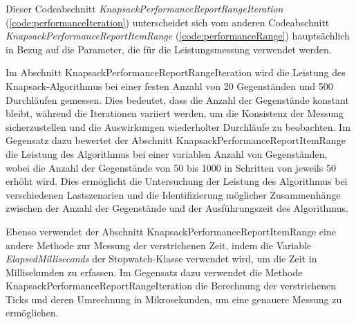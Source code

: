 Dieser Codeabschnitt \textit{KnapsackPerformanceReportRangeIteration} (\ref{code:performanceIteration}) unterscheidet sich vom anderen Codeabschnitt \textit{KnapsackPerformanceReportItemRange} (\ref{code:performanceRange}) hauptsächlich in Bezug auf die Parameter, die für die Leistungsmessung verwendet werden.

Im Abschnitt KnapsackPerformanceReportRangeIteration wird die Leistung des Knapsack-Algorithmus bei einer festen Anzahl von 20 Gegenständen und 500 Durchläufen gemessen. Dies bedeutet, dass die Anzahl der Gegenstände konstant bleibt, während die Iterationen variiert werden, um die Konsistenz der Messung sicherzustellen und die Auswirkungen wiederholter Durchläufe zu beobachten. Im Gegensatz dazu bewertet der Abschnitt KnapsackPerformanceReportItemRange die Leistung des Algorithmus bei einer variablen Anzahl von Gegenständen, wobei die Anzahl der Gegenstände von 50 bis 1000 in Schritten von jeweils 50 erhöht wird. Dies ermöglicht die Untersuchung der Leistung des Algorithmus bei verschiedenen Lastszenarien und die Identifizierung möglicher Zusammenhänge zwischen der Anzahl der Gegenstände und der Ausführungszeit des Algorithmus.

Ebenso verwendet der Abschnitt KnapsackPerformanceReportItemRange eine andere Methode zur Messung der verstrichenen Zeit, indem die Variable \textit{ElapsedMilliseconds} der Stopwatch-Klasse verwendet wird, um die Zeit in Millisekunden zu erfassen. Im Gegensatz dazu verwendet die Methode KnapsackPerformanceReportRangeIteration die Berechnung der verstrichenen Ticks und deren Umrechnung in Mikrosekunden, um eine genauere Messung zu ermöglichen.

